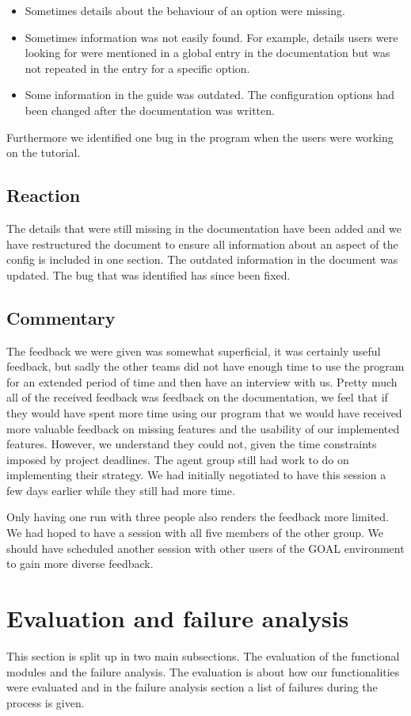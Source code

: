 \documentclass[11pt]{article}
\begin{document}
\begin{itemize}
	\item Sometimes details about the behaviour of an option were missing.
	\item Sometimes information was not easily found. For example, details users were looking for were mentioned in a global entry in the documentation but was not repeated in the entry for a specific option.
	\item Some information in the guide was outdated. The configuration options had been changed after the documentation was written.
\end{itemize}

Furthermore we identified one bug in the program when the users were working on the tutorial. 
\subsection{Reaction}
The details that were still missing in the documentation have been added and we have restructured the document to ensure all information about an aspect of the config is included in one section. The outdated information in the document was updated. The bug that was identified has since been fixed.

\subsection{Commentary}
The feedback we were given was somewhat superficial, it was certainly useful feedback, but sadly the other teams did not have enough time to use the program for an extended period of time and then have an interview with us. Pretty much all of the received feedback was feedback on the documentation, we feel that if they would have spent more time using our program that we would have received more valuable feedback on missing features and the usability of our implemented features. However, we understand they could not, given the time constraints imposed by project deadlines. The agent group still had work to do on implementing their strategy. We had initially negotiated to have this session a few days earlier while they still had more time.

Only having one run with three people also renders the feedback more limited. We had hoped to have a session with all five members of the other group. We should have scheduled another session with other users of the GOAL environment\cite{GOAL Env} to gain more diverse feedback.

\section{Evaluation and failure analysis}
This section is split up in two main subsections. The evaluation of the functional modules and the failure analysis. The evaluation is about how our functionalities were evaluated and in the failure analysis section a list of failures during the process is given.
\end{document}
